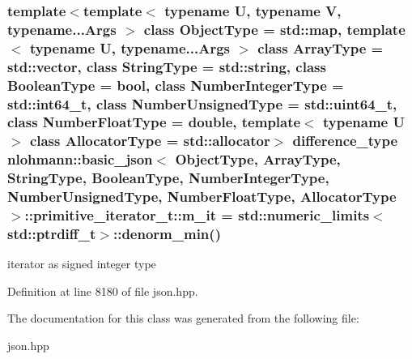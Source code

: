 \subsubsection[{m\+\_\+it}]{\setlength{\rightskip}{0pt plus 5cm}template$<$template$<$ typename U, typename V, typename...\+Args $>$ class Object\+Type = std\+::map, template$<$ typename U, typename...\+Args $>$ class Array\+Type = std\+::vector, class String\+Type  = std\+::string, class Boolean\+Type  = bool, class Number\+Integer\+Type  = std\+::int64\+\_\+t, class Number\+Unsigned\+Type  = std\+::uint64\+\_\+t, class Number\+Float\+Type  = double, template$<$ typename U $>$ class Allocator\+Type = std\+::allocator$>$ {\bf difference\+\_\+type} {\bf nlohmann\+::basic\+\_\+json}$<$ Object\+Type, Array\+Type, String\+Type, Boolean\+Type, Number\+Integer\+Type, Number\+Unsigned\+Type, Number\+Float\+Type, Allocator\+Type $>$\+::primitive\+\_\+iterator\+\_\+t\+::m\+\_\+it = std\+::numeric\+\_\+limits$<$std\+::ptrdiff\+\_\+t$>$\+::denorm\+\_\+min()\hspace{0.3cm}{\ttfamily [private]}}\label{classnlohmann_1_1basic__json_1_1primitive__iterator__t_aed1a94e17ea6a32cc75baa55e239b002}


iterator as signed integer type 



Definition at line 8180 of file json.\+hpp.



The documentation for this class was generated from the following file\+:\begin{DoxyCompactItemize}
\item 
json.\+hpp\end{DoxyCompactItemize}
